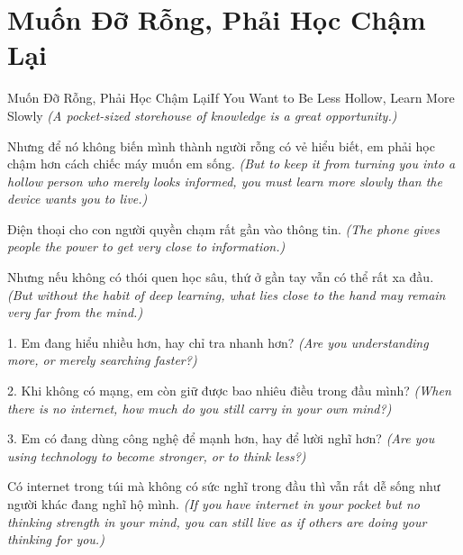\section{Muốn Đỡ Rỗng, Phải Học Chậm Lại}
\begin{truyen}{Muốn Đỡ Rỗng, Phải Học Chậm Lại}{If You Want to Be Less Hollow, Learn More Slowly}
\textit{(A pocket-sized storehouse of knowledge is a great opportunity.)}

Nhưng để nó không biến mình thành người rỗng có vẻ hiểu biết, em phải học chậm hơn cách chiếc máy muốn em sống.
\textit{(But to keep it from turning you into a hollow person who merely looks informed, you must learn more slowly than the device wants you to live.)}

\end{truyen}

\begin{baihoc}
Điện thoại cho con người quyền chạm rất gần vào thông tin.
\textit{(The phone gives people the power to get very close to information.)}

Nhưng nếu không có thói quen học sâu, thứ ở gần tay vẫn có thể rất xa đầu.
\textit{(But without the habit of deep learning, what lies close to the hand may remain very far from the mind.)}
\end{baihoc}

\begin{tuhocnhanh}
1. Em đang hiểu nhiều hơn, hay chỉ tra nhanh hơn? \textit{(Are you understanding more, or merely searching faster?)}

2. Khi không có mạng, em còn giữ được bao nhiêu điều trong đầu mình? \textit{(When there is no internet, how much do you still carry in your own mind?)}

3. Em có đang dùng công nghệ để mạnh hơn, hay để lười nghĩ hơn? \textit{(Are you using technology to become stronger, or to think less?)}
\end{tuhocnhanh}

\begin{tongketchuong}
Có internet trong túi mà không có sức nghĩ trong đầu thì vẫn rất dễ sống như người khác đang nghĩ hộ mình.
\textit{(If you have internet in your pocket but no thinking strength in your mind, you can still live as if others are doing your thinking for you.)}
\end{tongketchuong}

\ngancach